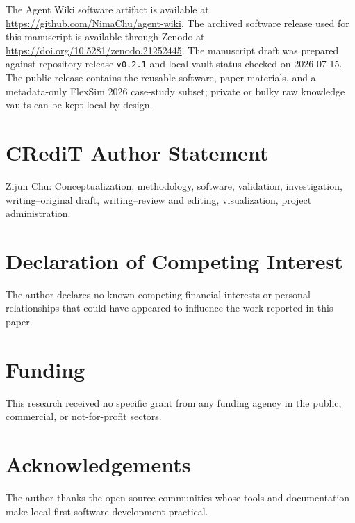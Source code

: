 \documentclass[11pt]{article}
\begin{document}
The Agent Wiki software artifact is available at
\url{https://github.com/NimaChu/agent-wiki}. The archived software release used
for this manuscript is available through Zenodo at
\url{https://doi.org/10.5281/zenodo.21252445}. The manuscript draft was prepared
against repository release \texttt{v0.2.1} and local vault status checked on
2026-07-15. The public release contains the reusable software, paper materials,
and a metadata-only FlexSim 2026 case-study subset; private or bulky raw
knowledge vaults can be kept local by design.

\section*{CRediT Author Statement}

Zijun Chu: Conceptualization, methodology, software, validation, investigation,
writing--original draft, writing--review and editing, visualization, project
administration.

\section*{Declaration of Competing Interest}

The author declares no known competing financial interests or personal
relationships that could have appeared to influence the work reported in this
paper.

\section*{Funding}

This research received no specific grant from any funding agency in the public,
commercial, or not-for-profit sectors.

\section*{Acknowledgements}

The author thanks the open-source communities whose tools and documentation
make local-first software development practical.
\end{document}
